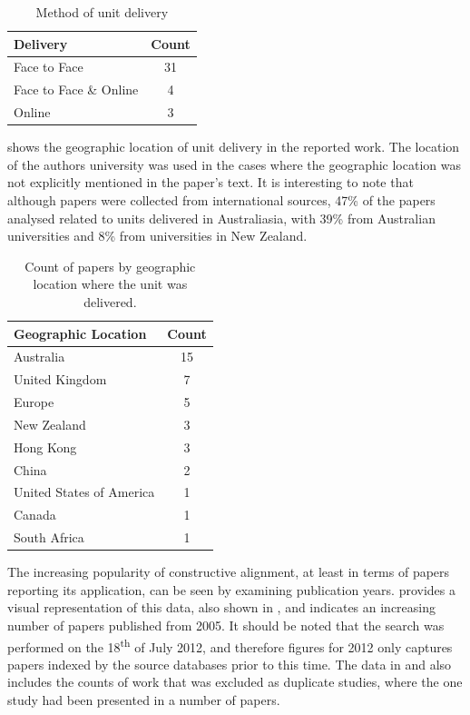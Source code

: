 \begin{table}[htbp]
	\centering
	\caption{Method of unit delivery}
	\label{tbl:delivery}
	\footnotesize
    \begin{tabular}{l|c}
    \textbf{Delivery} & \textbf{Count} \\ \hline
    Face to Face & 31 \\
    Face to Face \& Online & 4 \\
    Online & 3 \\
    \end{tabular}
\end{table}

 shows the geographic location of unit delivery in the reported work. The location of the authors university was used in the cases where the geographic location was not explicitly mentioned in the paper's text. It is interesting to note that although papers were collected from international sources, 47\% of the papers analysed related to units delivered in Australiasia, with 39\% from Australian universities and 8\% from universities in New Zealand. 

\begin{table}[htbp]
	\centering
	\caption{Count of papers by geographic location where the unit was delivered.}
	\label{tbl:location}
	\footnotesize
    \begin{tabular}{lc}
    \textbf{Geographic Location} & \textbf{Count} \\ \hline
		Australia	 & 15 \\
		United Kingdom & 	7 \\
		Europe & 	5 \\
		New Zealand & 	3 \\
		Hong Kong & 	3 \\
		China & 	2 \\
		United States of America & 	1 \\
		Canada & 	1 \\
		South Africa & 	1 \\
    \end{tabular}
\end{table}

The increasing popularity of constructive alignment, at least in terms of papers reporting its application, can be seen by examining publication years.  provides a visual representation of this data, also shown in , and indicates an increasing number of papers published from 2005. It should be noted that the search was performed on the 18\textsuperscript{th} of July 2012, and therefore figures for 2012 only captures papers indexed by the source databases prior to this time. The data in  and  also includes the counts of work that was excluded as duplicate studies, where the one study had been presented in a number of papers.

